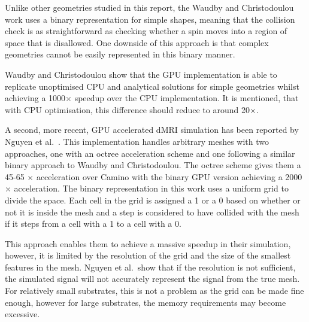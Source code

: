 Unlike other geometries studied in this report, the Waudby and Christodoulou work uses a binary representation for simple shapes, meaning that the collision check is as straightforward as checking whether a spin moves into a region of space that is disallowed.
One downside of this approach is that complex geometries cannot be easily represented in this binary manner.

Waudby and Christodoulou show that the \ac{GPU} implementation is able to replicate unoptimised \ac{CPU} and analytical solutions for simple geometries whilst achieving a 1000$\times$ speedup over the \ac{CPU} implementation.
It is mentioned, that with \ac{CPU} optimisation, this difference should reduce to around 20$\times$.

A second, more recent, \ac{GPU} accelerated \ac{dMRI} simulation has been reported by Nguyen et al.\ \cite{Nguyen2018}.
This implementation handles arbitrary meshes with two approaches, one with an octree acceleration scheme and one following a similar binary approach to Waudby and Christodoulou.
The octree scheme gives them a 45-65 $\times$ acceleration over Camino with the binary \ac{GPU} version achieving a 2000 $\times$ acceleration.
The binary representation in this work uses a uniform grid to divide the space.
Each cell in the grid is assigned a 1 or a 0 based on whether or not it is inside the mesh and a step is considered to have collided with the mesh if it steps from a cell with a 1 to a cell with a 0.

This approach enables them to achieve a massive speedup in their simulation, however, it is limited by the resolution of the grid and the size of the smallest features in the mesh.
Nguyen et al.\ show that if the resolution is not sufficient, the simulated signal will not accurately represent the signal from the true mesh.
For relatively small substrates, this is not a problem as the grid can be made fine enough, however for large substrates, the memory requirements may become excessive. 



